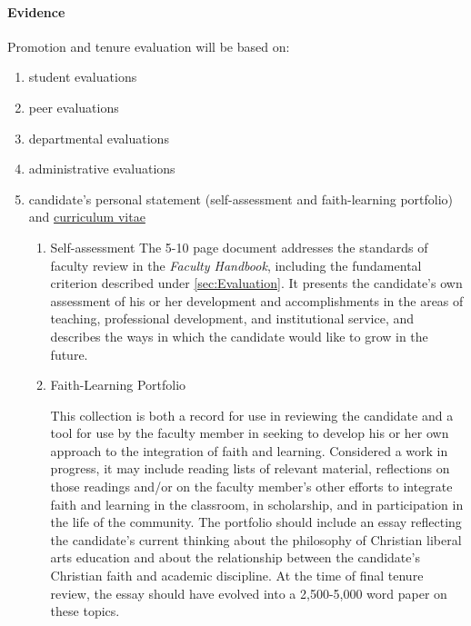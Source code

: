 			\paragraph{Evidence}
				Promotion and tenure evaluation will be based on:
				\label{par:Evidence}
				\begin{enumerate}[label=\alph*)]
					\item{student evaluations}
					\item{peer evaluations}
					\item{departmental evaluations}
					\item{administrative evaluations}
					\item{candidate's personal statement (self-assessment and faith-learning portfolio) and \underline{curriculum vitae}
						\label{sec:EvidencePersonalStatement}

						\begin{enumerate}[label=\arabic*)]
							\item{Self-assessment}
							The 5-10 page document addresses the standards of faculty review in the \emph{Faculty Handbook}, including the fundamental criterion described under
							\ref{sec:Evaluation}.  It presents the candidate's own assessment of his or her development and accomplishments in the areas of teaching, professional development, and institutional service, and describes the ways in which the candidate would like to grow in the future.
							\item{Faith-Learning Portfolio}

							This collection is both a record for use in
							reviewing the candidate and a tool for use by the
							faculty member in seeking to develop his or her own
							approach to the integration of faith and learning.
							Considered a work in progress, it may include
							reading lists of relevant material, reflections on
							those readings and/or on the faculty member's other
							efforts to integrate faith and learning in the
							classroom, in scholarship, and in participation in
							the life of the community.  The portfolio should
							include an essay reflecting the candidate's current
							thinking about the philosophy of Christian liberal
							arts education and about the relationship between
							the candidate's Christian faith and academic
							discipline.  At the time of final tenure review, the
							essay should have evolved into a 2,500-5,000 word paper on
							these topics.

						\end{enumerate}
					}
				\end{enumerate}
